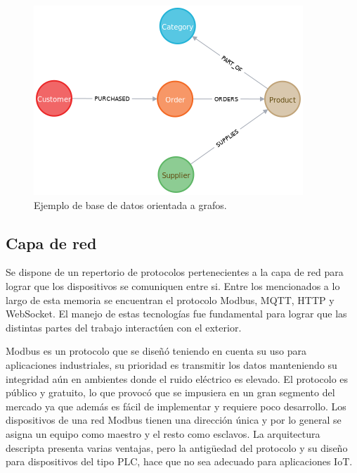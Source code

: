 \begin{figure}[h]
	\centering
	\includegraphics[width=.6\textwidth]{./Figures/ch1Grafo.png}
	\caption{Ejemplo de base de datos orientada a grafos. \citep{WEBSITE:neo4j}}
	\label{fig:ch1Grafo}
\end{figure}

\subsection{Capa de red}
Se dispone de un repertorio de protocolos pertenecientes a la capa de red para lograr que los dispositivos se comuniquen entre si.
Entre los mencionados a lo largo de esta memoria se encuentran el protocolo Modbus, MQTT, HTTP y WebSocket. El manejo de estas tecnologías fue fundamental para lograr que las distintas partes del trabajo interactúen con el exterior.

Modbus es un protocolo que se diseñó teniendo en cuenta su uso para aplicaciones industriales, su prioridad es transmitir los datos manteniendo su integridad aún en ambientes donde el ruido eléctrico es elevado. El protocolo es público y gratuito, lo que provocó que se impusiera en un gran segmento del mercado ya que además es fácil de implementar y requiere poco desarrollo. Los dispositivos de una red Modbus tienen una dirección única y por lo general se asigna un equipo como maestro y el resto como esclavos. La arquitectura descripta presenta varias ventajas, pero la antigüedad del protocolo y su diseño para dispositivos del tipo PLC, hace que no sea adecuado para aplicaciones IoT.

